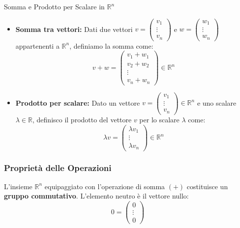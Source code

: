 \documentclass[11pt,a4paper]{article}
\begin{document}
\begin{definition}{Somma e Prodotto per Scalare in $\mathbb{R}^n$}{}
\begin{itemize}
    \item \textbf{Somma tra vettori:} Dati due vettori $v = \begin{pmatrix} v_1 \\ \vdots \\ v_n \end{pmatrix}$ e $w = \begin{pmatrix} w_1 \\ \vdots \\ w_n \end{pmatrix}$ appartenenti a $\mathbb{R}^n$, definiamo la somma come:
    $$ v + w = \begin{pmatrix} v_1 + w_1 \\ v_2 + w_2 \\ \vdots \\ v_n + w_n \end{pmatrix} \in \mathbb{R}^n $$
    \item \textbf{Prodotto per scalare:} Dato un vettore $v = \begin{pmatrix} v_1 \\ \vdots \\ v_n \end{pmatrix} \in \mathbb{R}^n$ e uno scalare $\lambda \in \mathbb{R}$, definisco il prodotto del vettore $v$ per lo scalare $\lambda$ come:
    $$ \lambda v = \begin{pmatrix} \lambda v_1 \\ \vdots \\ \lambda v_n \end{pmatrix} \in \mathbb{R}^n $$
\end{itemize}
\end{definition}

\subsubsection{Proprietà delle Operazioni}
L'insieme $\mathbb{R}^n$ equipaggiato con l'operazione di somma $(+)$ costituisce un \textbf{gruppo commutativo}. L'elemento neutro è il vettore nullo:
$$ 0 = \begin{pmatrix} 0 \\ \vdots \\ 0 \end{pmatrix} $$
\end{document}
